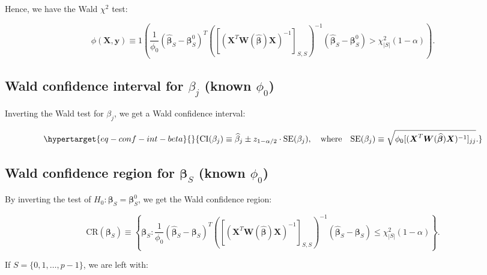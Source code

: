 \documentclass[
  11pt,
  letterpaper,
  oneside]{book}
\theoremstyle{definition}
\theoremstyle{plain}
\theoremstyle{plain}
\theoremstyle{plain}
\theoremstyle{remark}
\begin{document}
Hence, we have the Wald \(\chi^2\) test:

\[
\phi(\boldsymbol{X}, \boldsymbol{y}) \equiv 1\left(\frac{1}{\phi_0} (\boldsymbol{\widehat \beta}_S - \boldsymbol{\beta}_S^0)^T \left([(\boldsymbol{X}^T \boldsymbol{W}(\boldsymbol{\widehat \beta}) \boldsymbol{X})^{-1}]_{S,S}\right)^{-1}(\boldsymbol{\widehat \beta}_S - \boldsymbol{\beta}_S^0) > \chi^2_{|S|}(1-\alpha)\right).
\]

\hypertarget{sec-wald-ci-single-coeff}{%
\subsection{\texorpdfstring{Wald confidence interval for \(\beta_j\)
(known
\(\phi_0\))}{Wald confidence interval for \textbackslash beta\_j (known \textbackslash phi\_0)}}\label{sec-wald-ci-single-coeff}}

Inverting the Wald test for \(\beta_j\), we get a Wald confidence
interval:

\begin{equation}\protect\hypertarget{eq-conf-int-beta}{}{
\text{CI}(\beta_j) \equiv \widehat \beta_j \pm z_{1-\alpha/2} \cdot \text{SE}(\beta_j), \quad \text{where} \quad \text{SE}(\beta_j) \equiv \sqrt{\phi_0[(\boldsymbol{X}^T \boldsymbol{W}(\boldsymbol{\widehat \beta}) \boldsymbol{X})^{-1}]_{jj}}.
}\label{eq-conf-int-beta}\end{equation}

\hypertarget{sec-wald-cr-group-coeff}{%
\subsection{\texorpdfstring{Wald confidence region for
\(\boldsymbol{\beta}_S\) (known
\(\phi_0\))}{Wald confidence region for \textbackslash boldsymbol\{\textbackslash beta\}\_S (known \textbackslash phi\_0)}}\label{sec-wald-cr-group-coeff}}

By inverting the test of
\(H_0: \boldsymbol{\beta}_S = \boldsymbol{\beta}_S^0\), we get the Wald
confidence region:

\[
\text{CR}(\boldsymbol{\beta}_S) \equiv \left\{\boldsymbol{\beta}_S: \frac{1}{\phi_0} (\boldsymbol{\widehat \beta}_S - \boldsymbol{\beta}_S)^T \left([(\boldsymbol{X}^T \boldsymbol{W}(\boldsymbol{\widehat \beta}) \boldsymbol{X})^{-1}]_{S,S}\right)^{-1}(\boldsymbol{\widehat \beta}_S - \boldsymbol{\beta}_S) \leq \chi^2_{|S|}(1-\alpha)\right\}.
\]

If \(S = \{0, 1, \dots, p-1\}\), we are left with:
\end{document}
